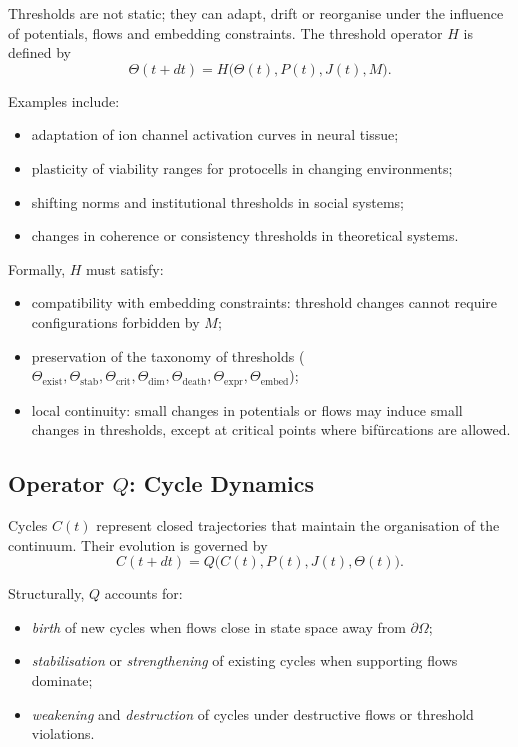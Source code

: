 Thresholds are not static; they can adapt, drift or reorganise under the
influence of potentials, flows and embedding constraints. The threshold
operator \(H\) is defined by
\[
  \Theta(t+dt) = H\big(\Theta(t), P(t), J(t), M\big).
\]

Examples include:
\begin{itemize}
  \item adaptation of ion channel activation curves in neural tissue;
  \item plasticity of viability ranges for protocells in changing environments;
  \item shifting norms and institutional thresholds in social systems;
  \item changes in coherence or consistency thresholds in theoretical systems.
\end{itemize}

Formally, \(H\) must satisfy:
\begin{itemize}
  \item compatibility with embedding constraints: threshold changes cannot
        require configurations forbidden by \(M\);
  \item preservation of the taxonomy of thresholds
        (\(\Theta_{\mathrm{exist}}, \Theta_{\mathrm{stab}},
        \Theta_{\mathrm{crit}}, \Theta_{\mathrm{dim}},
        \Theta_{\mathrm{death}}, \Theta_{\mathrm{expr}}, \Theta_{\mathrm{embed}}\));
  \item local continuity: small changes in potentials or flows may induce small
        changes in thresholds, except at critical points where bifürcations are
        allowed.
\end{itemize}

\subsection{Operator \texorpdfstring{\texorpdfstring{$Q$}{Q}}{Q}: Cycle Dynamics}

Cycles \(C(t)\) represent closed trajectories that maintain the organisation of
the continuum. Their evolution is governed by
\[
  C(t+dt) = Q\big(C(t), P(t), J(t), \Theta(t)\big).
\]

Structurally, \(Q\) accounts for:
\begin{itemize}
  \item \emph{birth} of new cycles when flows close in state space away from
        \(\partial\Omega\);
  \item \emph{stabilisation} or \emph{strengthening} of existing cycles when
        supporting flows dominate;
  \item \emph{weakening} and \emph{destruction} of cycles under destructive
        flows or threshold violations.
\end{itemize}

